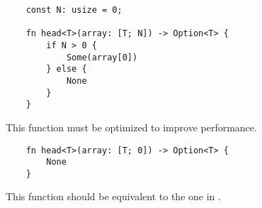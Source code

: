 \begin{listing}
    \begin{verbatim}
    const N: usize = 0;

    fn head<T>(array: [T; N]) -> Option<T> {
        if N > 0 {
            Some(array[0])
        } else {
            None
        }
    }
    \end{verbatim}
    \caption{This function must be optimized to improve performance.}
    \label{lst:static_control_flow}
\end{listing}

\begin{listing}
    \begin{verbatim}
    fn head<T>(array: [T; 0]) -> Option<T> {
        None
    }
    \end{verbatim}
    \caption{This function should be equivalent to the one in .}
    \label{lst:optimized}
\end{listing}
